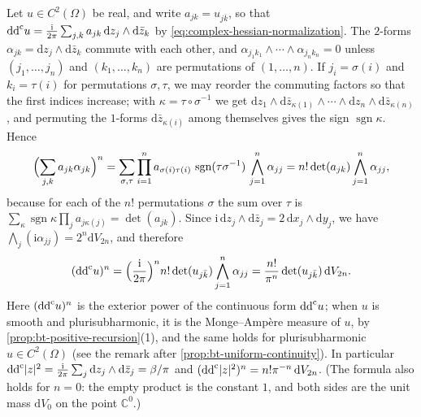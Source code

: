 Let $u\in C^2(\Omega)$ be real, and write $a_{jk}=u_{j\bar k}$, so that $\mathrm{dd}^{\mathrm{c}} u=\frac{\mathrm i}{2\pi}\sum_{j,k}a_{jk}\,\mathrm dz_j\wedge\mathrm d\bar z_k$ by \eqref{eq:complex-hessian-normalization}. The $2$-forms $\alpha_{jk}=\mathrm dz_j\wedge\mathrm d\bar z_k$ commute with each other, and $\alpha_{j_1k_1}\wedge\cdots\wedge\alpha_{j_nk_n}=0$ unless $(j_1,\ldots,j_n)$ and $(k_1,\ldots,k_n)$ are permutations of $(1,\ldots,n)$. If $j_i=\sigma(i)$ and $k_i=\tau(i)$ for permutations $\sigma,\tau$, we may reorder the commuting factors so that the first indices increase; with $\kappa=\tau\circ\sigma^{-1}$ we get $\mathrm dz_1\wedge\mathrm d\bar z_{\kappa(1)}\wedge\cdots\wedge\mathrm dz_n\wedge\mathrm d\bar z_{\kappa(n)}$, and permuting the $1$-forms $\mathrm d\bar z_{\kappa(i)}$ among themselves gives the sign $\operatorname{sgn}\kappa$. Hence
\[
 \Bigl(\sum_{j,k}a_{jk}\alpha_{jk}\Bigr)^n
 =\sum_{\sigma,\tau}\prod_{i=1}^na_{\sigma(i)\tau(i)}\,\operatorname{sgn}(\tau\sigma^{-1})\,\bigwedge_{j=1}^n\alpha_{jj}
 =n!\det(a_{jk})\bigwedge_{j=1}^n\alpha_{jj},
\]
because for each of the $n!$ permutations $\sigma$ the sum over $\tau$ is $\sum_\kappa\operatorname{sgn}\kappa\prod_ja_{j\kappa(j)}=\det(a_{jk})$. Since $\mathrm{i}\,\mathrm{d}z_j\wedge\mathrm{d}\bar z_j=2\,\mathrm{d}x_j\wedge\mathrm{d}y_j$, we have $\bigwedge_j(\mathrm i\alpha_{jj})=2^n\mathrm dV_{2n}$, and therefore
\begin{equation}\label{eq:bt-determinant-normalization}
 (\mathrm{dd}^{\mathrm{c}} u)^n=\Bigl(\frac{\mathrm i}{2\pi}\Bigr)^nn!\det(u_{j\bar k})\bigwedge_{j=1}^n\alpha_{jj}=\frac{n!}{\pi^n}\det(u_{j\bar k})\,\mathrm{d}V_{2n}.
\end{equation}
Here $(\mathrm{dd}^{\mathrm{c}} u)^n$ is the exterior power of the continuous form $\mathrm{dd}^{\mathrm{c}} u$; when $u$ is smooth and plurisubharmonic, it is the Monge--Amp\`ere measure of $u$, by \cref{prop:bt-positive-recursion}(1), and the same holds for plurisubharmonic $u\in C^2(\Omega)$ (see the remark after \cref{prop:bt-uniform-continuity}). In particular $\mathrm{dd}^{\mathrm{c}}|z|^2=\frac{\mathrm i}{2\pi}\sum_j\mathrm dz_j\wedge\mathrm d\bar z_j=\beta/\pi$ and $(\mathrm{dd}^{\mathrm{c}}|z|^2)^n=n!\pi^{-n}\,\mathrm dV_{2n}$. (The formula also holds for $n=0$: the empty product is the constant $1$, and both sides are the unit mass $\mathrm{d}V_0$ on the point $\mathbb C^0$.)

